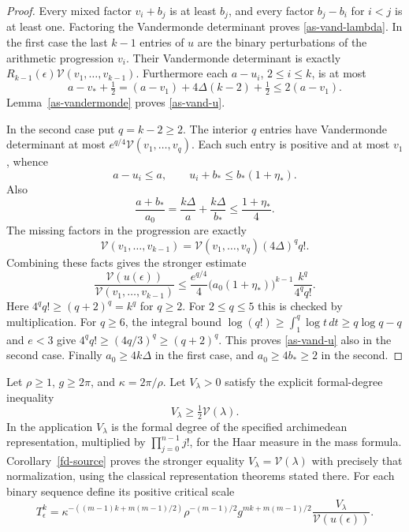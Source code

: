 \begin{proof}
Every mixed factor $v_i+b_j$ is at least $b_j$, and every
factor $b_j-b_i$ for $i<j$ is at least one.
Factoring the Vandermonde determinant proves
\eqref{as-vand-lambda}.
In the first case the last $k-1$ entries of $u$ are the
binary perturbations of the arithmetic progression $v_i$.
Their Vandermonde determinant is exactly
$R_{k-1}(\epsilon)\mathcal V(v_1,\ldots,v_{k-1})$.
Furthermore each $a-u_i$, $2\leq i\leq k$, is at most
\[
 a-v_*+\tfrac12
   =(a-v_1)+4\Delta(k-2)+\tfrac12
   \leq2(a-v_1).
\]
Lemma~\ref{as-vandermonde} proves \eqref{as-vand-u}.

In the second case put $q=k-2\geq2$.
The interior $q$ entries have Vandermonde determinant at most
$e^{q/4}\mathcal V(v_1,\ldots,v_q)$.
Each such entry is positive and at most $v_1$, whence
\[
 a-u_i\leq a,\qquad u_i+b_*\leq b_*(1+\eta_*).
\]
Also
\[
 \frac{a+b_*}{a_0}=\frac{k\Delta}{a}+\frac{k\Delta}{b_*}
                  \leq\frac{1+\eta_*}{4}.
\]
The missing factors in the progression are exactly
\[
 \mathcal V(v_1,\ldots,v_{k-1})
       =\mathcal V(v_1,\ldots,v_q)(4\Delta)^q q!.
\]
Combining these facts gives the stronger estimate
\[
 \frac{\mathcal V(u(\epsilon))}
      {\mathcal V(v_1,\ldots,v_{k-1})}
 \leq\frac{e^{q/4}}4
       \bigl(a_0(1+\eta_*)\bigr)^{k-1}
                  \frac{k^q}{4^q q!}.
\]
Here $4^q q!\geq(q+2)^q=k^q$ for $q\geq2$.
For $2\leq q\leq5$ this is checked by multiplication.
For $q\geq6$, the integral bound
$\log(q!)\geq\int_1^q\log t\,dt\geq q\log q-q$
and $e<3$ give $4^q q!\geq(4q/3)^q\geq(q+2)^q$.
This proves \eqref{as-vand-u} also in the second case.
Finally $a_0\geq4k\Delta$ in the first case, and
$a_0\geq4b_*\geq2$ in the second.
\end{proof}

Let $\rho\geq1$, $g\geq2\pi$, and $\kappa=2\pi/\rho$.
Let $V_\lambda>0$ satisfy the explicit formal-degree inequality
\begin{equation}\label{as-formal-degree-assumption}
 V_\lambda\geq\tfrac12\mathcal V(\lambda).
\end{equation}
In the application $V_\lambda$ is the formal degree of the
specified archimedean representation, multiplied by
$\prod_{j=0}^{n-1}j!$, for the Haar measure in the mass formula.
Corollary~\ref{fd-source} proves the stronger equality
$V_\lambda=\mathcal V(\lambda)$ with precisely that normalization,
using the classical representation theorems stated there.
For each binary sequence define its positive critical scale
\begin{equation}\label{as-critical-scale}
 T_\epsilon^k=
 \kappa^{-((m-1)k+m(m-1)/2)}\rho^{-(m-1)/2}
 g^{mk+m(m-1)/2}
       \frac{V_\lambda}{\mathcal V(u(\epsilon))}.
\end{equation}

